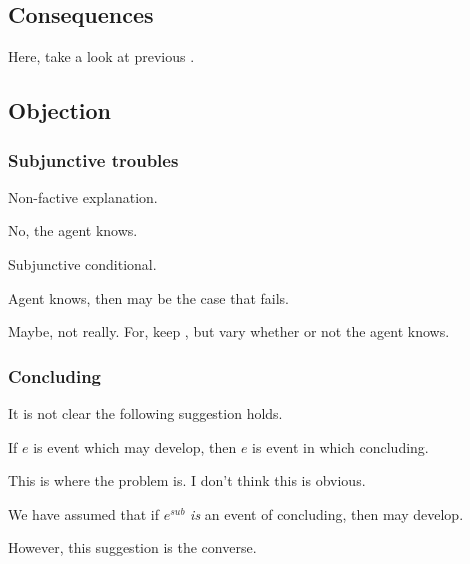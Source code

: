 \subsection{Consequences}
\label{sec:consequences}

\begin{note}
  Here, take a look at previous .
\end{note}


\subsection{Objection}
\label{sec:objection}

\subsubsection{Subjunctive troubles}
\label{sec:subjunctive-troubles}

\begin{note}
  Non-factive explanation.

  No, the agent knows.
\end{note}

\begin{note}
  Subjunctive conditional.

  Agent knows, then may be the case that \requ{} fails.

  Maybe, not really.
  For, keep \requ{}, but vary whether or not the agent knows.
\end{note}

\subsubsection{Concluding}
\label{sec:concluding}

\begin{note}
  It is not clear the following suggestion holds.
  \begin{suggestion}
    If \(e\) is event which may develop, then \(e\) is event in which concluding.

    {
      \color{red}
      This is where the problem is.
      I don't think this is obvious.

      We have assumed that if \(e^{sub}\) \emph{is} an event of concluding, then may develop.

      However, this suggestion is the converse.
    }
  \end{suggestion}
\end{note}


